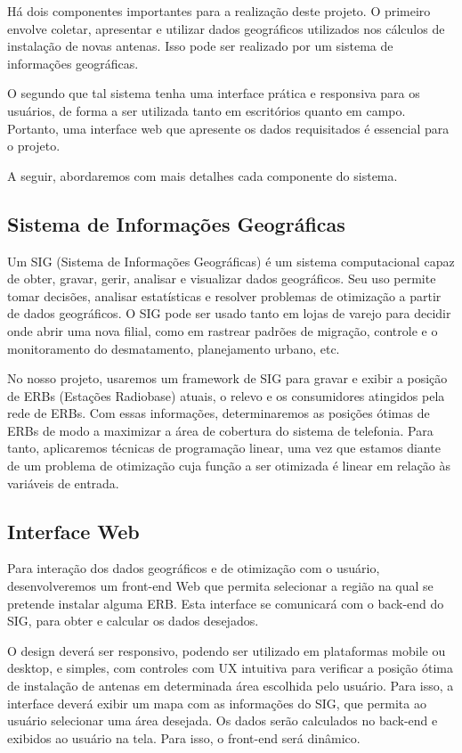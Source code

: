\documentclass[]{politex}
\begin{document}
Há dois componentes importantes para a realização deste projeto. O primeiro
envolve coletar, apresentar e utilizar dados geográficos utilizados nos cálculos
de instalação de novas antenas. Isso pode ser realizado por um sistema de
informações geográficas.

O segundo que tal sistema tenha uma interface prática e responsiva para os
usuários, de forma a ser utilizada tanto em escritórios quanto em campo.
Portanto, uma interface web que apresente os dados requisitados é essencial
para o projeto.

A seguir, abordaremos com mais detalhes cada componente do sistema.

\subsection{Sistema de Informações Geográficas}
Um SIG (Sistema de Informações Geográficas) é um sistema computacional capaz de
obter, gravar, gerir, analisar e visualizar dados geográficos. Seu uso permite
tomar decisões, analisar estatísticas e resolver problemas de otimização a
partir de dados geográficos. O SIG pode ser usado tanto em lojas de varejo para
decidir onde abrir uma nova filial, como em rastrear padrões de migração,
controle e o monitoramento do desmatamento, planejamento urbano, etc.

No nosso projeto, usaremos um framework de SIG para gravar e exibir a posição de
ERBs (Estações Radiobase) atuais, o relevo e os consumidores atingidos pela
rede de ERBs. Com essas informações, determinaremos as posições ótimas de
ERBs de modo a maximizar a área de cobertura do sistema de telefonia.
Para tanto, aplicaremos técnicas de programação linear, uma vez que
estamos diante de um problema de otimização cuja função a ser otimizada
é linear em relação às variáveis de entrada.

\subsection{Interface Web}
Para interação dos dados geográficos e de otimização com o usuário,
desenvolveremos um front-end Web que permita selecionar a região na qual se
pretende instalar alguma ERB. Esta interface se comunicará com o back-end do
SIG, para obter e calcular os dados desejados.

O design deverá ser responsivo, podendo ser utilizado em plataformas mobile
ou desktop, e simples, com controles com UX intuitiva para verificar a posição
ótima de instalação de antenas em determinada área escolhida pelo usuário. Para
isso, a interface deverá exibir um mapa com as informações do SIG, que permita
ao usuário selecionar uma área desejada. Os dados serão calculados no back-end e
exibidos ao usuário na tela. Para isso, o front-end será dinâmico.
\end{document}
